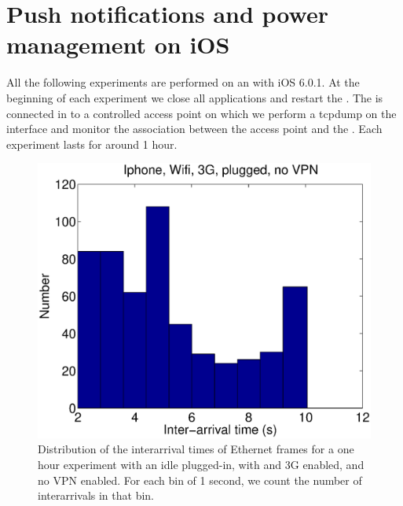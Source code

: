\section{Push notifications and power management on iOS}
\label{sec:pushnotification}

All the following experiments are performed on an  with iOS
6.0.1.  At the beginning of each experiment we close all applications
and restart the \iphone{}. The \iphone{} is connected in \wifi{} to a
controlled access point on which we perform a tcpdump on the \wifi{}
interface and monitor the \wifi{} association between the access point
and the \iphone{}. Each experiment lasts for around 1 hour. 

\begin{figure}
\centering
        \includegraphics[width=0.8\linewidth]{../../code/pushNotification/Fig/bw_iphone_wifi_3g_plug_novpn_interTs.eps}
  \caption{Distribution of the interarrival times of Ethernet frames
    for a one hour experiment with an idle \iphone{} plugged-in, with \wifi{} and 3G
    enabled, and no VPN enabled. For each bin of 1 second, we count
    the number of interarrivals in that bin.}
  \label{fig:push_w3p_interTs}
\end{figure}

